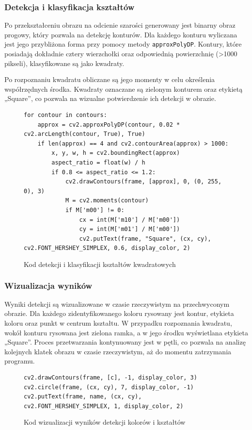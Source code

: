 \subsubsection{Detekcja i klasyfikacja kształtów}

Po przekształceniu obrazu na odcienie szarości generowany jest binarny obraz progowy, który pozwala na detekcję konturów. Dla każdego konturu wyliczana jest jego przybliżona forma przy pomocy metody \texttt{approxPolyDP}. Kontury, które posiadają dokładnie cztery wierzchołki oraz odpowiednią powierzchnię (>1000 pikseli), klasyfikowane są jako kwadraty.

Po rozpoznaniu kwadratu obliczane są jego momenty w celu określenia współrzędnych środka. Kwadraty oznaczane są zielonym konturem oraz etykietą „Square”, co pozwala na wizualne potwierdzenie ich detekcji w obrazie.

\begin{figure}[H]
  \centering
  \begin{lstlisting}
for contour in contours:
    approx = cv2.approxPolyDP(contour, 0.02 * cv2.arcLength(contour, True), True)
    if len(approx) == 4 and cv2.contourArea(approx) > 1000:
        x, y, w, h = cv2.boundingRect(approx)
        aspect_ratio = float(w) / h
        if 0.8 <= aspect_ratio <= 1.2:
            cv2.drawContours(frame, [approx], 0, (0, 255, 0), 3)
            M = cv2.moments(contour)
            if M['m00'] != 0:
                cx = int(M['m10'] / M['m00'])
                cy = int(M['m01'] / M['m00'])
                cv2.putText(frame, "Square", (cx, cy), cv2.FONT_HERSHEY_SIMPLEX, 0.6, display_color, 2)
  \end{lstlisting}
  \caption{Kod detekcji i klasyfikacji kształtów kwadratowych}
  \label{fig:square_detection}
\end{figure}

\subsubsection{Wizualizacja wyników}

Wyniki detekcji są wizualizowane w czasie rzeczywistym na przechwyconym obrazie. Dla każdego zidentyfikowanego koloru rysowany jest kontur, etykieta koloru oraz punkt w centrum kształtu. W przypadku rozpoznania kwadratu, wokół konturu rysowana jest zielona ramka, a w jego środku wyświetlana etykieta „Square”. Proces przetwarzania kontynuowany jest w pętli, co pozwala na analizę kolejnych klatek obrazu w czasie rzeczywistym, aż do momentu zatrzymania programu.

\begin{figure}[H]
  \centering
  \begin{lstlisting}
cv2.drawContours(frame, [c], -1, display_color, 3)
cv2.circle(frame, (cx, cy), 7, display_color, -1)
cv2.putText(frame, name, (cx, cy), cv2.FONT_HERSHEY_SIMPLEX, 1, display_color, 2)
  \end{lstlisting}
  \caption{Kod wizualizacji wyników detekcji kolorów i kształtów}
  \label{fig:visualization}
\end{figure}
